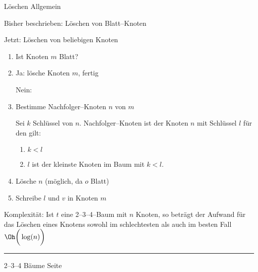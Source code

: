 \begin{slide}{}
\normalsize

\begin{center}
L\"oschen Allgemein
\end{center}
\vspace*{0.5cm}

\footnotesize
Bisher beschrieben: L\"oschen von Blatt--Knoten

Jetzt: L\"oschen von beliebigen Knoten
\begin{enumerate}
\item Ist Knoten $m$ Blatt?
\item Ja: l\"osche Knoten $m$, fertig
      \vspace*{0.4cm}

      Nein: 
\item Bestimme Nachfolger--Knoten $n$ von $m$

      Sei $k$ Schl\"ussel von $n$. Nachfolger--Knoten ist der Knoten $n$ mit Schl\"ussel $l$
      f\"ur den gilt:
      \begin{enumerate}
      \item $k < l$
      \item $l$ ist der kleinste Knoten im Baum mit $k < l$.
      \end{enumerate}
\item L\"osche $n$ (m\"oglich, da $o$ Blatt)
\item Schreibe $l$ und $v$ in Knoten $m$
\end{enumerate}
Komplexit\"at:  Ist $t$ eine 2--3--4--Baum mit $n$ Knoten, so betr\"agt der Aufwand f\"ur das
L\"oschen eines Knotens sowohl im schlechtesten als auch im besten Fall \\[0.6cm]
\hspace*{2.3cm} $\Oh\bigg(\log(n)\bigg)$


\vspace*{\fill}
\tiny \addtocounter{mypage}{1}
\rule{17cm}{1mm}
2--3--4 B\"aume  \hspace*{\fill} Seite 
\end{slide}


